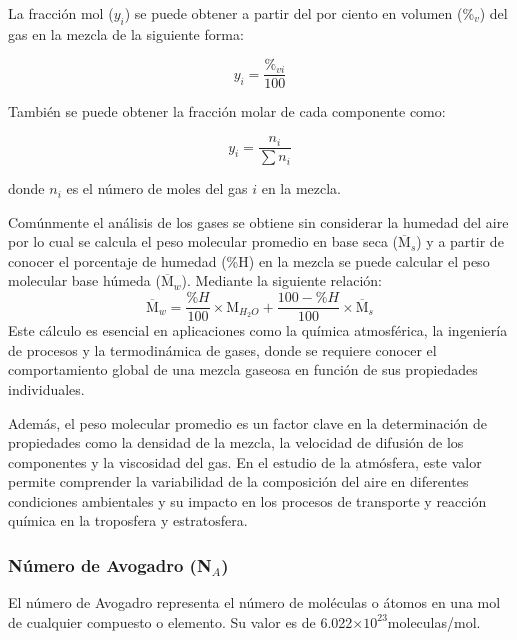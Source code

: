 La fracci\'on mol ($y_i$) se puede obtener a partir del por ciento en volumen (\%$_v$) del gas en la mezcla de la siguiente forma:

\begin{equation}
y_i = \frac{\%_{vi} }{100} 
\label{fraccion}
\end{equation}

También se puede obtener la fracción molar de cada componente  como:

\begin{equation}
y_i = \frac{n_i}{\sum n_i}
\end{equation}

donde $n_i$ es el número de moles del gas $i$ en la mezcla.

Com\'unmente el an\'alisis de los gases se obtiene sin considerar la humedad del aire por lo cual se calcula el peso molecular promedio en base seca ($\overline{\textrm{M}}_s$) y a partir de conocer el porcentaje de humedad (\%H) en la mezcla se puede calcular el peso molecular base h\'umeda ($\overline{\textrm{M}}_w$). Mediante la siguiente relaci\'on:
\begin{equation}
\overline{\textrm{M}}_w= \frac{\%H}{100}\times \textrm{M}_{H_2O} +
\frac{100-\%H}{100} \times \overline{\textrm{M}}_s
\label{hum}
\end{equation}
Este cálculo es esencial en aplicaciones como la química atmosférica, la ingeniería de procesos y la termodinámica de gases, donde se requiere conocer el comportamiento global de una mezcla gaseosa en función de sus propiedades individuales. 

Además, el peso molecular promedio es un factor clave en la determinación de propiedades como la densidad de la mezcla, la velocidad de difusión de los componentes y la viscosidad del gas. En el estudio de la atmósfera, este valor permite comprender la variabilidad de la composición del aire en diferentes condiciones ambientales y su impacto en los procesos de transporte y reacción química en la troposfera y estratosfera.

\subsubsection{N\'umero de Avogadro (N$_A$)}
 
 El n\'umero de Avogadro representa el n\'umero de mol\'e\-culas o \'atomos en una mol de cualquier compuesto o elemento. Su valor es de 6.022$\times10^{23}$moleculas/mol.
 
